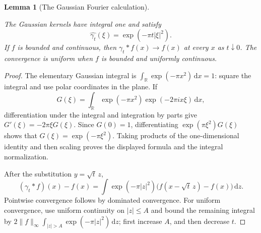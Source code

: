 \documentclass[11pt]{amsart}
\newcommand{\R}{\mathbb R}
\newcommand{\dd}{\,\mathrm d}
\newtheorem{lemma}[theorem]{Lemma}
\theoremstyle{definition}
\theoremstyle{remark}
\numberwithin{equation}{section}
\providecommand{\lean}[1]{}
\providecommand{\leanok}{}
\begin{document}
\begin{lemma}[The Gaussian Fourier calculation]\label{ext:gaussian}
\lean{Auto.ext_gaussian_integral,Auto.ext_gaussian_fourier,Auto.ext_gaussian_pointwise,Auto.ext_gaussian_uniform}
\leanok
The Gaussian kernels have integral one and satisfy
\[
 \widehat{\gamma_t}(\xi)=\exp(-\pi t|\xi|^2).
\]
If $f$ is bounded and continuous, then $\gamma_t*f(x)\to f(x)$
at every $x$ as $t\downarrow0$.  The convergence is uniform when
$f$ is bounded and uniformly continuous.
\end{lemma}
\begin{proof}
The elementary Gaussian integral is
$\int_\R\exp(-\pi x^2)\dd x=1$: square the integral and use polar
coordinates in the plane.  If
\[
 G(\xi)=\int_\R\exp(-\pi x^2)\exp(-2\pi i x\xi)\dd x,
\]
differentiation under the integral and integration by parts give
$G'(\xi)=-2\pi\xi G(\xi)$.  Since $G(0)=1$, differentiating
$\exp(\pi\xi^2)G(\xi)$ shows that $G(\xi)=\exp(-\pi\xi^2)$.
Taking products of the one-dimensional identity and then scaling
proves the displayed formula and the integral normalization.

After the substitution $y=\sqrt t\,z$,
\[
 (\gamma_t*f)(x)-f(x)
 =\int\exp(-\pi|z|^2)
               \big(f(x-\sqrt t\,z)-f(x)\big)\dd z.
\]
Pointwise convergence follows by dominated convergence.  For uniform
convergence, use uniform continuity on $|z|\le A$ and bound the
remaining integral by
$2\|f\|_\infty\int_{|z|>A}\exp(-\pi|z|^2)\dd z$; first increase
$A$, and then decrease $t$.
\end{proof}
\end{document}
